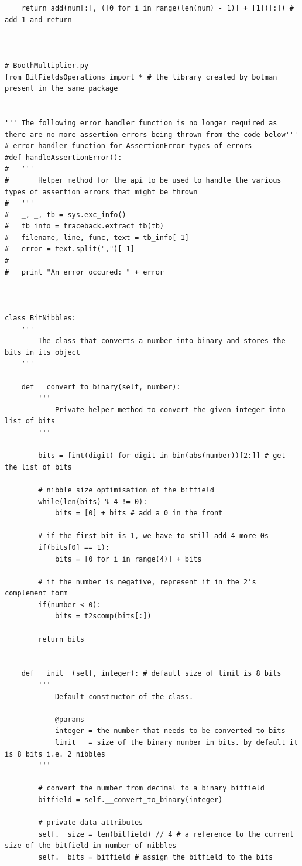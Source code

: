 \documentclass[10pt,a4paper]{article}
\newenvironment{changemargin}[2]{%
\begin{list}{}{%
\setlength{\topsep}{0pt}%
\setlength{\leftmargin}{#1}%
\setlength{\rightmargin}{#2}%
\setlength{\listparindent}{\parindent}%
\setlength{\itemindent}{\parindent}%
\setlength{\parsep}{\parskip}%
}%
\item[]}{\end{list}}
\begin{document}
\begin{changemargin}{-4cm}{-4cm}
\begin{lstlisting}
	return add(num[:], ([0 for i in range(len(num) - 1)] + [1])[:]) # add 1 and return



# BoothMultiplier.py
from BitFieldsOperations import * # the library created by botman present in the same package


''' The following error handler function is no longer required as there are no more assertion errors being thrown from the code below'''
# error handler function for AssertionError types of errors
#def handleAssertionError():
#	'''
#		Helper method for the api to be used to handle the various types of assertion errors that might be thrown
#	'''
#	_, _, tb = sys.exc_info()
#	tb_info = traceback.extract_tb(tb)
#	filename, line, func, text = tb_info[-1]
#	error = text.split(",")[-1]
#
#	print "An error occured: " + error



class BitNibbles:
	'''
		The class that converts a number into binary and stores the bits in its object
	'''

	def __convert_to_binary(self, number):
		'''
			Private helper method to convert the given integer into list of bits
		'''

		bits = [int(digit) for digit in bin(abs(number))[2:]] # get the list of bits

		# nibble size optimisation of the bitfield
		while(len(bits) % 4 != 0):
			bits = [0] + bits # add a 0 in the front

		# if the first bit is 1, we have to still add 4 more 0s
		if(bits[0] == 1):
			bits = [0 for i in range(4)] + bits

		# if the number is negative, represent it in the 2's complement form
		if(number < 0):
			bits = t2scomp(bits[:])

		return bits


	def __init__(self, integer): # default size of limit is 8 bits
		'''
			Default constructor of the class.

			@params
			integer = the number that needs to be converted to bits
			limit  	= size of the binary number in bits. by default it is 8 bits i.e. 2 nibbles
		'''

		# convert the number from decimal to a binary bitfield
		bitfield = self.__convert_to_binary(integer)

		# private data attributes
		self.__size = len(bitfield) // 4 # a reference to the current size of the bitfield in number of nibbles
		self.__bits = bitfield # assign the bitfield to the bits




\end{lstlisting}
\end{changemargin}
\end{document}
